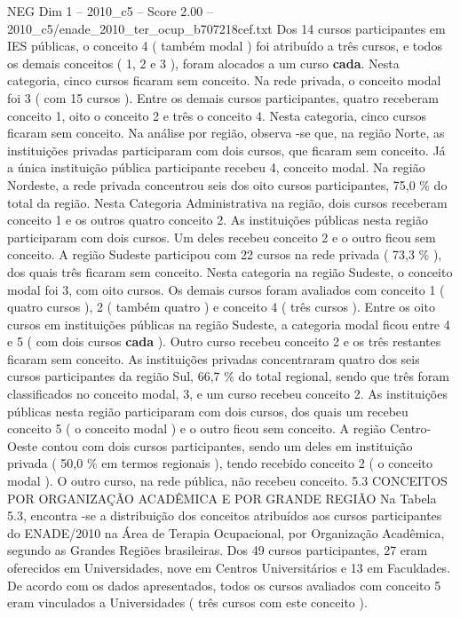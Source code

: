 \begin{textsample}{NEG Dim 1 – 2010\_c5 – Score 2.00 – 2010\_c5/enade\_2010\_ter\_ocup\_b707218cef.txt}
Dos 14 cursos participantes em IES públicas, o conceito 4 ( também modal ) foi atribuído a três cursos, e todos os demais conceitos ( 1, 2 e 3 ), foram alocados a um curso \textbf{cada}.
Nesta categoria, cinco cursos ficaram sem conceito.
Na rede privada, o conceito modal foi 3 ( com 15 cursos ).
Entre os demais cursos participantes, quatro receberam conceito 1, oito o conceito 2 e três o conceito 4.
Nesta categoria, cinco cursos ficaram sem conceito.
Na análise por região, observa -se que, na região Norte, as instituições privadas participaram com dois cursos, que ficaram sem conceito.
Já a única instituição pública participante recebeu 4, conceito modal.
Na região Nordeste, a rede privada concentrou seis dos oito cursos participantes, 75,0 \% do total da região.
Nesta Categoria Administrativa na região, dois cursos receberam conceito 1 e os outros quatro conceito 2.
As instituições públicas nesta região participaram com dois cursos.
Um deles recebeu conceito 2 e o outro ficou sem conceito.
A região Sudeste participou com 22 cursos na rede privada ( 73,3 \% ), dos quais três ficaram sem conceito.
Nesta categoria na região Sudeste, o conceito modal foi 3, com oito cursos.
Os demais cursos foram avaliados com conceito 1 ( quatro cursos ), 2 ( também quatro ) e conceito 4 ( três cursos ).
Entre os oito cursos em instituições públicas na região Sudeste, a categoria modal ficou entre 4 e 5 ( com dois cursos \textbf{cada} ).
Outro curso recebeu conceito 2 e os três restantes ficaram sem conceito.
As instituições privadas concentraram quatro dos seis cursos participantes da região Sul, 66,7 \% do total regional, sendo que três foram classificados no conceito modal, 3, e um curso recebeu conceito 2.
As instituições públicas nesta região participaram com dois cursos, dos quais um recebeu conceito 5 ( o conceito modal ) e o outro ficou sem conceito.
A região Centro-Oeste contou com dois cursos participantes, sendo um deles em instituição privada ( 50,0 \% em termos regionais ), tendo recebido conceito 2 ( o conceito modal ).
O outro curso, na rede pública, não recebeu conceito. 5.3 CONCEITOS POR ORGANIZAÇÃO ACADÊMICA E POR GRANDE REGIÃO Na Tabela 5.3, encontra -se a distribuição dos conceitos atribuídos aos cursos participantes do ENADE/2010 na Área de Terapia Ocupacional, por Organização Acadêmica, segundo as Grandes Regiões brasileiras.
Dos 49 cursos participantes, 27 eram oferecidos em Universidades, nove em Centros Universitários e 13 em Faculdades.
De acordo com os dados apresentados, todos os cursos avaliados com conceito 5 eram vinculados a Universidades ( três cursos com este conceito ).

\end{textsample}
